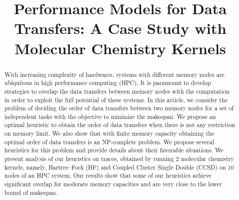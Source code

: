\documentclass[runningheads]{llncs} %
\begin{document}
	\title{Performance Models for Data Transfers: A Case Study with Molecular Chemistry Kernels}
	\author{}
	\maketitle              %
	\begin{abstract} 

With increasing complexity of hardwares, systems with different memory nodes are ubiquitous in high performance computing (HPC). It is paramount to develop strategies to overlap the data transfers between memory nodes with the computation in order to exploit the full potential of these systems. In this article, we consider the problem of deciding the  order of data transfers between two memory nodes for a set of independent tasks  with the objective to minimize the makespan. We propose an optimal heuristic to obtain the order of data transfers when there is not any restriction on memory limit. We also show that with finite memory capacity obtaining the optimal order of data transfers is an NP-complete problem. We propose several heuristics for this problem and provide details about their favorable situations. We present analysis of our heuristics on traces, obtained by running 2 molecular chemistry kernels, namely, Hartree–Fock (HF)  and Coupled Cluster Single Double (CCSD) on 10 nodes of an HPC system. Our results show that some of our heuristics achieve significant overlap for moderate memory capacities and are very close to the lower bound of makespan.

	\end{abstract} %
\end{document}

